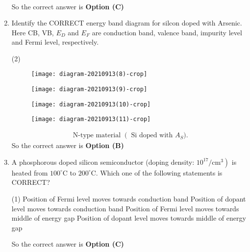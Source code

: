 \begin{enumerate}
\begin{answer}
\begin{align*}
		\end{align*}
		So the correct answer is \textbf{Option (C)}
	\end{answer}
	\item Identify the CORRECT energy band diagram for silcon doped with Arsenic. Here CB, VB, $E_{D}$ and $E_{F}$ are conduction band, valence band, impurity level and Fermi level, respectively.
	{	}
	\begin{tasks}(2)
		\task[\textbf{A.}] \begin{figure}[H]
			\centering
			\texttt{[image: diagram-20210913(8)-crop]}
		\end{figure}
		\task[\textbf{B.}] \begin{figure}[H]
			\centering
			\texttt{[image: diagram-20210913(9)-crop]}
		\end{figure}
		\task[\textbf{C.}] \begin{figure}[H]
			\centering
			\texttt{[image: diagram-20210913(10)-crop]}
		\end{figure}
		\task[\textbf{D.}] \begin{figure}[H]
			\centering
			\texttt{[image: diagram-20210913(11)-crop]}
		\end{figure}
	\end{tasks}
	\begin{answer}
		\begin{align*}
		\text{	N-type material }\left(\right.\text{ Si doped with }A_{S} ).
		\end{align*}
		So the correct answer is \textbf{Option (B)}
	\end{answer}
	\item A phosphorous doped silicon semiconductor (doping density: $\left.10^{17} / \mathrm{cm}^{3}\right)$ is heated from $100^{\circ} \mathrm{C}$ to $200^{\circ} \mathrm{C}$. Which one of the following statements is CORRECT?
	{	}
	\begin{tasks}(1)
		\task[\textbf{A.}] Position of Fermi level moves towards conduction band
		\task[\textbf{B.}] Position of dopant level moves towards conduction band
		\task[\textbf{C.}] Position of Fermi level moves towards middle of energy gap
		\task[\textbf{D.}] Position of dopant level moves towards middle of energy gap
	\end{tasks}
	\begin{answer}
		So the correct answer is \textbf{Option (C)}
	\end{answer}

\end{enumerate}

